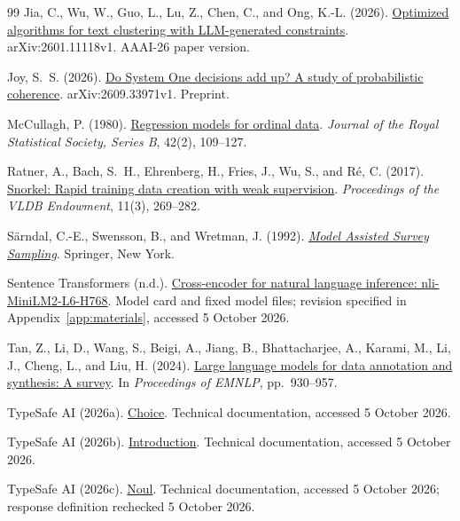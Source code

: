 \documentclass[UTF8,a4paper,zihao=-4,fontset=fandol]{ctexart}
\begin{document}
\begin{thebibliography}{99}
Jia, C., Wu, W., Guo, L., Lu, Z., Chen, C., and Ong, K.-L. (2026).
\href{https://arxiv.org/abs/2601.11118v1}{Optimized algorithms for text clustering with LLM-generated constraints}.
arXiv:2601.11118v1. AAAI-26 paper version.

Joy, S.~S. (2026).
\href{https://arxiv.org/abs/2609.33971v1}{Do System One decisions add up? A study of probabilistic coherence}.
arXiv:2609.33971v1. Preprint.

McCullagh, P. (1980).
\href{https://doi.org/10.1111/j.2517-6161.1980.tb01109.x}{Regression models for ordinal data}.
\emph{Journal of the Royal Statistical Society, Series B}, 42(2), 109--127.

Ratner, A., Bach, S.~H., Ehrenberg, H., Fries, J., Wu, S., and R{\'e}, C. (2017).
\href{https://doi.org/10.14778/3157794.3157797}{Snorkel: Rapid training data creation with weak supervision}.
\emph{Proceedings of the VLDB Endowment}, 11(3), 269--282.

S{\"a}rndal, C.-E., Swensson, B., and Wretman, J. (1992).
\href{https://link.springer.com/book/9780387406206}{\emph{Model Assisted Survey Sampling}}.
Springer, New York.

Sentence Transformers (n.d.).
\href{https://huggingface.co/cross-encoder/nli-MiniLM2-L6-H768}{Cross-encoder for natural language inference: nli-MiniLM2-L6-H768}.
Model card and fixed model files; revision specified in Appendix~\ref{app:materials}, accessed 5 October 2026.

Tan, Z., Li, D., Wang, S., Beigi, A., Jiang, B., Bhattacharjee, A., Karami, M., Li, J., Cheng, L., and Liu, H. (2024).
\href{https://doi.org/10.18653/v1/2024.emnlp-main.54}{Large language models for data annotation and synthesis: A survey}.
In \emph{Proceedings of EMNLP}, pp.~930--957.

TypeSafe AI (2026a).
\href{https://docs.typesafe.ai/primitives/choice}{Choice}.
Technical documentation, accessed 5 October 2026.

TypeSafe AI (2026b).
\href{https://docs.typesafe.ai/introduction}{Introduction}.
Technical documentation, accessed 5 October 2026.

TypeSafe AI (2026c).
\href{https://docs.typesafe.ai/primitives/noul}{Noul}.
Technical documentation, accessed 5 October 2026; response definition rechecked 5 October 2026.


\end{thebibliography}
\end{document}
